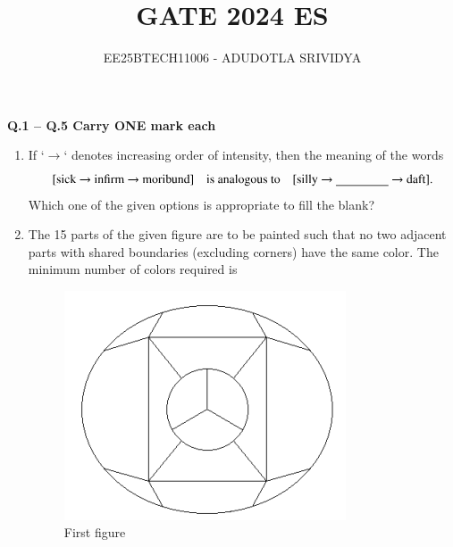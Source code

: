 \documentclass[journal]{IEEEtran}
\numberwithin{equation}{enumi}
\numberwithin{figure}{enumi}
\begin{document}

\vspace{3cm}

\title{GATE 2024 ES}
\author{EE25BTECH11006 - ADUDOTLA SRIVIDYA}
\maketitle
\noindent
\textbf{Q.1 -- Q.5 Carry ONE mark each}

\vspace{0.5cm}

\begin{enumerate}[start=1, label={Q\arabic*.}]

\item If `$\rightarrow$` denotes increasing order of intensity, then the meaning of the words
\[
\text{[sick $\rightarrow$ infirm $\rightarrow$ moribund]} \quad \text{is analogous to} \quad \text{[silly $\rightarrow$ \underline{\hspace{1.5cm}} $\rightarrow$ daft]}.
\]
Which one of the given options is appropriate to fill the blank?
\begin{enumerate}[label=(\Alph*)]
  \end{enumerate}
\item The 15 parts of the given figure are to be painted such that no two adjacent parts with shared boundaries (excluding corners) have the same color. The minimum number of colors required is
\begin{figure}[H]
    \centering
    \includegraphics[width=0.3\linewidth]{figs/fig1.png}
    \caption{First figure}
    \label{fig:first}
\end{figure}
\begin{enumerate}[label=(\Alph*)]
  \end{enumerate}
  

\end{enumerate}
\end{document}
